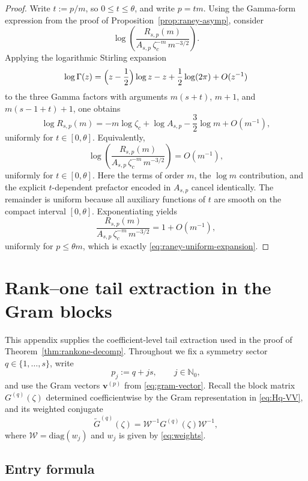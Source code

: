 \documentclass[11pt]{amsart}
\numberwithin{equation}{section}
\theoremstyle{plain}
\theoremstyle{definition}
\theoremstyle{remark}
\newcommand{\NN}{\mathbb{N}}
\begin{document}
\begin{proof}
	Write \(t:=p/m\), so \(0\le t\le\theta\), and write \(p=tm\).
	Using the Gamma-form expression from the proof of
	Proposition~\ref{prop:raney-asymp}, consider
	\[
		\log\!\left(
		\frac{R_{s,p}(m)}{A_{s,p}\,\zeta_c^{-m}\,m^{-3/2}}
		\right).
	\]
	Applying the logarithmic Stirling expansion
	\[
		\log\Gamma(z)=\Bigl(z-\frac12\Bigr)\log z-z+\frac12\log(2\pi)+O(z^{-1})
	\]
	to the three Gamma factors with arguments \(m(s+t)\), \(m+1\), and
	\(m(s-1+t)+1\), one obtains
	\[
		\log R_{s,p}(m)
		=
		-m\log\zeta_c+\log A_{s,p}-\frac32\log m+O(m^{-1}),
	\]
	uniformly for \(t\in[0,\theta]\). Equivalently,
	\[
		\log\!\left(
		\frac{R_{s,p}(m)}{A_{s,p}\,\zeta_c^{-m}\,m^{-3/2}}
		\right)
		=
		O(m^{-1}),
	\]
	uniformly for \(t\in[0,\theta]\). Here the terms of order \(m\), the
	\(\log m\) contribution, and the explicit \(t\)-dependent prefactor
	encoded in \(A_{s,p}\) cancel identically. The remainder is uniform because
	all auxiliary functions of \(t\) are smooth on the compact interval
	\([0,\theta]\). Exponentiating yields
	\[
		\frac{R_{s,p}(m)}{A_{s,p}\,\zeta_c^{-m}\,m^{-3/2}}
		=1+O(m^{-1}),
	\]
	uniformly for \(p\le \theta m\), which is exactly
	\eqref{eq:raney-uniform-expansion}.
\end{proof}

\section{Rank--one tail extraction in the Gram blocks}
\label{app:rankone-form}

This appendix supplies the coefficient-level tail extraction used in the proof
of Theorem~\ref{thm:rankone-decomp}. Throughout we fix a symmetry sector
\(q\in\{1,\dots,s\}\), write
\[
    p_j:=q+js,\qquad j\in\NN_0,
\]
and use the Gram vectors \(\bm v^{(p)}\) from \eqref{eq:gram-vector}. Recall the
block matrix \(G^{(q)}(\zeta)\) determined coefficientwise by the Gram
representation in \eqref{eq:Hq-VV}, and its weighted conjugate
\[
    \widetilde G^{(q)}(\zeta)=\mathcal W^{-1}G^{(q)}(\zeta)\mathcal W^{-1},
\]
where \(\mathcal W=\mathrm{diag}(w_j)\) and \(w_j\) is given by
\eqref{eq:weights}.

\subsection{Entry formula}
\end{document}
